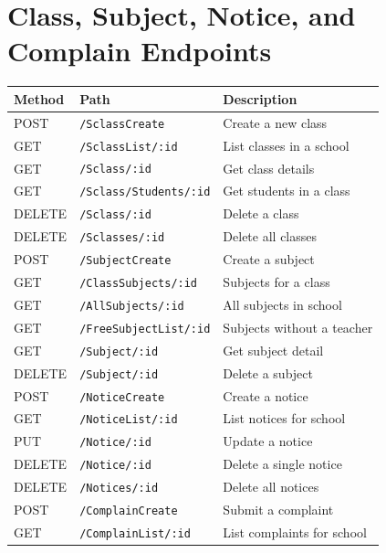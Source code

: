 \documentclass[12pt,a4paper]{report}
\begin{document}
\section{Class, Subject, Notice, and Complain Endpoints}

\begin{longtable}{@{}p{1.5cm}p{6.5cm}p{6cm}@{}}
  \toprule
  \textbf{Method} & \textbf{Path} & \textbf{Description} \\
  \midrule
  \endhead
  POST   & \texttt{/SclassCreate} & Create a new class \\[3pt]
  GET    & \texttt{/SclassList/:id} & List classes in a school \\[3pt]
  GET    & \texttt{/Sclass/:id} & Get class details \\[3pt]
  GET    & \texttt{/Sclass/Students/:id} & Get students in a class \\[3pt]
  DELETE & \texttt{/Sclass/:id} & Delete a class \\[3pt]
  DELETE & \texttt{/Sclasses/:id} & Delete all classes \\[3pt]
  \midrule
  POST   & \texttt{/SubjectCreate} & Create a subject \\[3pt]
  GET    & \texttt{/ClassSubjects/:id} & Subjects for a class \\[3pt]
  GET    & \texttt{/AllSubjects/:id} & All subjects in school \\[3pt]
  GET    & \texttt{/FreeSubjectList/:id} & Subjects without a teacher \\[3pt]
  GET    & \texttt{/Subject/:id} & Get subject detail \\[3pt]
  DELETE & \texttt{/Subject/:id} & Delete a subject \\[3pt]
  \midrule
  POST   & \texttt{/NoticeCreate} & Create a notice \\[3pt]
  GET    & \texttt{/NoticeList/:id} & List notices for school \\[3pt]
  PUT    & \texttt{/Notice/:id} & Update a notice \\[3pt]
  DELETE & \texttt{/Notice/:id} & Delete a single notice \\[3pt]
  DELETE & \texttt{/Notices/:id} & Delete all notices \\[3pt]
  \midrule
  POST   & \texttt{/ComplainCreate} & Submit a complaint \\[3pt]
  GET    & \texttt{/ComplainList/:id} & List complaints for school \\
  \bottomrule
\end{longtable}
\end{document}
